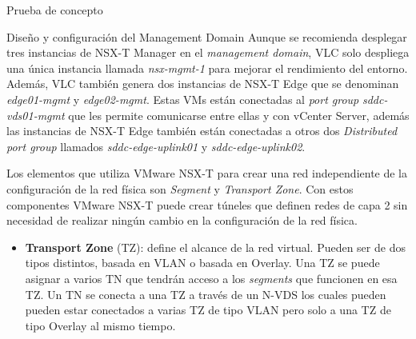 \begin{section}{Prueba de concepto}
\begin{subsection}{Diseño y configuración del Management Domain}
    Aunque se recomienda desplegar tres instancias de NSX-T Manager en el \textit{management domain}, VLC solo despliega una única instancia llamada \textit{nsx-mgmt-1} para mejorar el rendimiento del entorno. Además, VLC también genera dos instancias de NSX-T Edge que se denominan \textit{edge01-mgmt} y \textit{edge02-mgmt}. %
    Estas VMs están conectadas al \textit{port group} \textit{sddc-vds01-mgmt} que les permite comunicarse entre ellas y con vCenter Server, además las instancias de NSX-T Edge también están conectadas a otros dos \textit{Distributed port group} llamados \textit{sddc-edge-uplink01} y \textit{sddc-edge-uplink02}. %
    
    Los elementos que utiliza VMware NSX-T para crear una red independiente de la configuración de la red física son \textit{Segment} y \textit{Transport Zone}. Con estos componentes VMware NSX-T puede crear túneles que definen redes de capa 2 sin necesidad de realizar ningún cambio en la configuración de la red física.
    \begin{itemize}
      \item \textbf{Transport Zone} (TZ): define el alcance de la red virtual. Pueden ser de dos tipos distintos, basada en VLAN o basada en Overlay. Una TZ se puede asignar a varios TN que tendrán acceso a los \textit{segments} que funcionen en esa TZ. Un TN se conecta a una TZ a través de un N-VDS los cuales pueden pueden estar conectados a varias TZ de tipo VLAN pero solo a una TZ de tipo Overlay al mismo tiempo.
      

\end{itemize}
\end{subsection}
\end{section}
